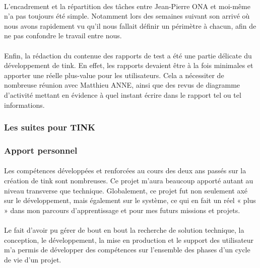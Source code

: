 \documentclass[12pt,a4paper]{report}
\begin{document}
\paragraph*{}L'encadrement et la répartition des tâches entre Jean-Pierre ONA et moi-même n'a pas toujours été simple. Notamment lors des semaines suivant son arrivé où nous avons rapidement vu qu'il nous fallait définir un périmètre à chacun, afin de ne pas confondre le travail entre nous.
\paragraph*{}Enfin, la rédaction du contenue des rapports de test a été une partie délicate du développement de \gls{tink}. En effet, les rapports devaient être à la fois minimales et apporter une réelle plus-value pour les utilisateurs. Cela a nécessiter de nombreuse réunion avec Matthieu ANNE, ainsi que des revus de diagramme d'activité mettant en évidence à quel instant écrire dans le rapport tel ou tel informations. \\

\subsubsection{Les suites pour TINK}
\paragraph*{}

\subsubsection{Apport personnel}
\paragraph*{}Les compétences développées et renforcées au cours des deux ans passés sur la création de \gls{tink} sont nombreuses. Ce projet m’aura beaucoup apporté autant au niveau transverse que technique. Globalement, ce projet fut non seulement axé sur le développement, mais également sur le système, ce qui en fait un réel « plus » dans mon parcours d’apprentissage et pour mes futurs missions et projets.
\paragraph*{}Le fait d'avoir pu gérer de bout en bout la recherche de solution technique, la conception, le développement, la mise en production et le support des utilisateur m'a permis de développer des compétences sur l'ensemble des phases d'un cycle de vie d'un projet. \\
\end{document}

